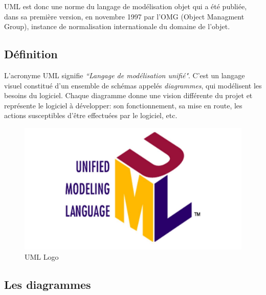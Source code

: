 \documentclass[french]{report}
\begin{document}
UML est donc une norme du langage de modélisation objet qui a été publiée, dans
sa première version, en novembre 1997 par l'OMG (Object Managment Group),
instance de normalisation internationale du domaine de l'objet.

\subsection{Définition}

L'acronyme UML signifie \emph{``Langage de modélisation unifié"}. C'est un
langage visuel constitué d'un ensemble de schémas appelés \emph{diagrammes}, qui
modélisent les besoins du logiciel. Chaque diagramme donne une vision différente
du projet et représente le logiciel à développer: son fonctionnement, sa mise en
route, les actions susceptibles d'être effectuées par le logiciel, etc.
\cite{UML2}

\begin{figure}[!h] 
    \center 
    \includegraphics[width=1\linewidth]{images/uml-logo-large.jpg} 
    \caption{UML Logo}
\end{figure}

\subsection{Les diagrammes}
\end{document}
